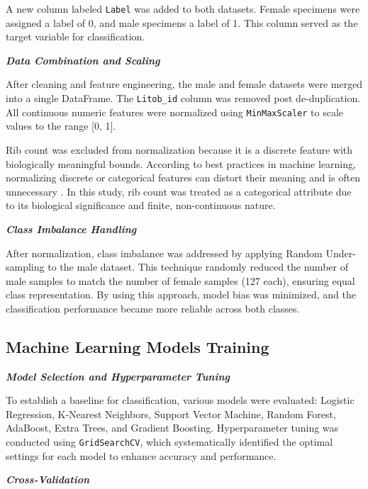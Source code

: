 A new column labeled \texttt{Label} was added to both datasets. Female specimens were assigned a label of 0, and male specimens a label of 1. This column served as the target variable for classification.

\textbf{\textit{Data Combination and Scaling}}

After cleaning and feature engineering, the male and female datasets were merged into a single DataFrame. The \texttt{Litob\_id} column was removed post de-duplication. All continuous numeric features were normalized using \texttt{MinMaxScaler} to scale values to the range [0, 1].

Rib count was excluded from normalization because it is a discrete feature with biologically meaningful bounds. According to best practices in machine learning, normalizing discrete or categorical features can distort their meaning and is often unnecessary \cite{jaiswal2024}. In this study, rib count was treated as a categorical attribute due to its biological significance and finite, non-continuous nature.

\textbf{\textit{Class Imbalance Handling}}

After normalization, class imbalance was addressed by applying Random Under-sampling to the male dataset. This technique randomly reduced the number of male samples to match the number of female samples (127 each), ensuring equal class representation. By using this approach, model bias was minimized, and the classification performance became more reliable across both classes.

\vspace{0.5cm}
\begin{minipage}{\linewidth}
	\subsection{Machine Learning Models Training}
\end{minipage}

\textbf{\textit{Model Selection and Hyperparameter Tuning}}

To establish a baseline for classification, various models were evaluated: Logistic Regression, K-Nearest Neighbors, Support Vector Machine, Random Forest, AdaBoost, Extra Trees, and Gradient Boosting. Hyperparameter tuning was conducted using \texttt{GridSearchCV}, which systematically identified the optimal settings for each model to enhance accuracy and performance.

\textbf{\textit{Cross-Validation}}

